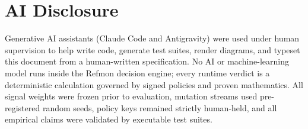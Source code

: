 \documentclass[10pt,twocolumn,letterpaper]{article}
\makeatletter
\theoremstyle{plain}
\theoremstyle{definition}
\theoremstyle{remark}
\DeclareRobustCommand{\_}{\ifmmode\nfss@text{\textunderscore}\else\textunderscore\penalty\@highpenalty\hskip\z@skip\fi}
\makeatother
\begin{document}
\section{AI Disclosure}
\label{sec:ai_disclosure}
Generative AI assistants (Claude Code and Antigravity) were used under human supervision to help write code, generate test suites, render diagrams, and typeset this document from a human-written specification. No AI or machine-learning model runs inside the Refmon decision engine; every runtime verdict is a deterministic calculation governed by signed policies and proven mathematics. All signal weights were frozen prior to evaluation, mutation streams used pre-registered random seeds, policy keys remained strictly human-held, and all empirical claims were validated by executable test suites.

\end{document}
